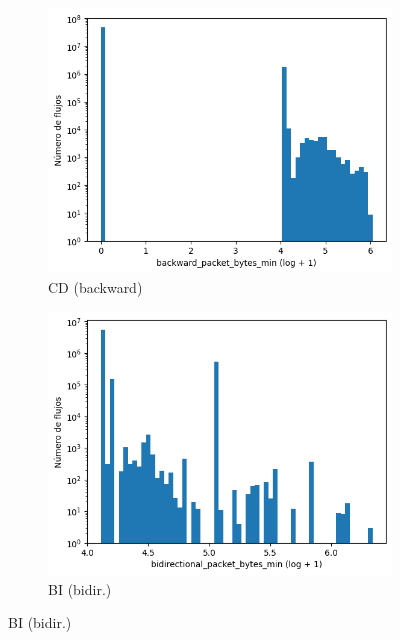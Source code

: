 \begin{figure}[H]
\begin{subfigure}[b]{0.26\textwidth}
        \includegraphics[width=\textwidth]{media/packet_pincer_cicddos/backward_packet_bytes_min_log_x_log_y.png}
        \caption{CD (backward)} \label{fig:packet_pincer_packet_bytes_min_backward}
    \end{subfigure}
    \hfill
    \begin{subfigure}[b]{0.26\textwidth}
        \centering
        \includegraphics[width=\linewidth]{media/packet_pincer_botiot/bidirectional_packet_bytes_min_log_x_log_y.png}
        \caption{BI (bidir.)}

\end{subfigure}
\end{figure}
